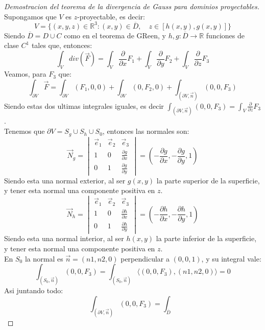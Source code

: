 \begin{proof}[Demostracion del teorema de la divergencia de Gauss para dominios proyectables]
    Supongamos que $V$ es $z$-proyectable, es decir:
    $$ V = \{(x,y,z) \in \mathbb{R}^3 : (x,y) \in \overline{D}, \quad z \in [h(x,y), g(x,y)]\}$$
    Siendo $\overline{D} = D \cup C$ como en el teorema de GReen, y $h,g : \overline{D} \to \mathbb{R}$ funciones de clase $C^1$ tales que, entonces:
    $$ \int_V div(\vec{F}) = \int_V \frac{\partial}{\partial x} F_1 + \int_V \frac{\partial}{\partial y} F_2 + \int_V \frac{\partial}{\partial z} F_3$$
    Veamos, para $F_3$ que:
    $$ \int_{\partial V} \vec{F} = \int_{\partial V} (F_1, 0, 0) + \int_{\partial V} (0, F_2, 0) + \int_{(\partial V, \vec{n})} (0, 0, F_3)$$
    Siendo estas dos ultimas integrales iguales, es decir $\int_{(\partial V, \vec{n})} (0, 0, F_3) = \int_V \frac{\partial}{\partial z} F_3$.\\
    Tenemos que $\partial V = S_g \cup S_h \cup S_0$, entonces las normales son:
    $$ \vec{N}_{g} =
    \begin{vmatrix}
        \vec{e}_1 & \vec{e}_2 & \vec{e}_3 \\
        1 & 0 & \frac{\partial g}{\partial x} \\
        0 & 1 & \frac{\partial g}{\partial y}
    \end{vmatrix} = \left( -\frac{\partial g}{\partial x}, -\frac{\partial g}{\partial y}, 1 \right)$$
    Siendo esta una normal exterior, al ser $g(x,y)$ la parte superior de la superficie, y tener esta normal una componente positiva en $z$.
    $$ \vec{N}_{h} =
    \begin{vmatrix}
        \vec{e}_1 & \vec{e}_2 & \vec{e}_3 \\
        1 & 0 & \frac{\partial h}{\partial x} \\
        0 & 1 & \frac{\partial h}{\partial y}
    \end{vmatrix} = \left( -\frac{\partial h}{\partial x}, -\frac{\partial h}{\partial y}, 1 \right)$$
    Siendo esta una normal interior, al ser $h(x,y)$ la parte inferior de la superficie, y tener esta normal una componente positiva en $z$.\\
    En $S_0$ la normal es $\vec{n}=(n1,n2,0)$ perpendicular a $(0,0,1)$, y su integral vale:
    $$ \int_{(S_0, \vec{n})} (0,0,F_3) = \int_{(S_0, \vec{n})} \langle (0,0,F_3), (n1,n2,0) \rangle = 0$$
    Asi juntando todo:
    $$ \int_{(\partial V, \vec{n})} (0,0,F_3) = \int_{\overline{D} }$$
        
\end{proof}

